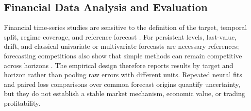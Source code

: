 \subsection{Financial Data Analysis and Evaluation}

Financial time-series studies are sensitive to the definition of the target, temporal split, regime coverage, and reference forecast \cite{finance-dl-survey}.
For persistent levels, last-value, drift, and classical univariate or multivariate forecasts are necessary references; forecasting competitions also show that simple methods can remain competitive across horizons \cite{m4,m5}.
The empirical design therefore reports results by target and horizon rather than pooling raw errors with different units.
Repeated neural fits and paired loss comparisons over common forecast origins quantify uncertainty, but they do not establish a stable market mechanism, economic value, or trading profitability.
